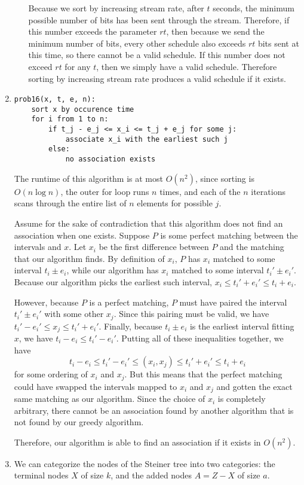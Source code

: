 \documentclass[oneside, 12pt]{article}
\begin{document}
\begin{enumerate}
\begin{enumerate}
Because we sort by increasing stream rate, after $t$ seconds, the minimum possible number of bits has been sent through the stream. Therefore, if this number exceeds the parameter $rt$, then because we send the minimum number of bits, every other schedule also exceeds $rt$ bits sent at this time, so there cannot be a valid schedule. If this number does not exceed $rt$ for any $t$, then we simply have a valid schedule. Therefore sorting by increasing stream rate produces a valid schedule if it exists. 
\end{enumerate}
\clearpage
\setcounter{enumi}{15}
\item
\begin{lstlisting}
prob16(x, t, e, n):
	sort x by occurence time
	for i from 1 to n:
		if t_j - e_j <= x_i <= t_j + e_j for some j:
			associate x_i with the earliest such j
		else:
			no association exists
\end{lstlisting}
The runtime of this algorithm is at most $O(n^2)$, since sorting is $O(n \log n)$, the outer for loop runs $n$ times, and each of the $n$ iterations scans through the entire list of $n$ elements for possible $j$. 

Assume for the sake of contradiction that this algorithm does not find an association when one exists. Suppose $P$ is some perfect matching between the intervals and $x$. Let $x_i$ be the first difference between $P$ and the matching that our algorithm finds. By definition of $x_i$, $P$ has $x_i$ matched to some interval $t_i \pm e_i$, while our algorithm has $x_i$ matched to some interval $t_i' \pm e_i'$. Because our algorithm picks the earliest such interval, $x_i \le t_i' + e_i' \le t_i + e_i$. 

However, because $P$ is a perfect matching, $P$ must have paired the interval $t_i' \pm e_i'$ with some other $x_j$. Since this pairing must be valid, we have $t_i' - e_i' \le x_j \le t_i' + e_i'$. Finally, because $t_i \pm e_i$ is the earliest interval fitting $x$, we have $t_i - e_i \le t_i' - e_i'$. Putting all of these inequalities together, we have 
\[
t_i - e_i \le t_i' - e_i' \le (x_i, x_j) \le t_i' + e_i' \le t_i + e_i
\]
for some ordering of $x_i$ and $x_j$. But this means that the perfect matching could have swapped the intervals mapped to $x_i$ and $x_j$ and gotten the exact same matching as our algorithm. Since the choice of $x_i$ is completely arbitrary, there cannot be an association found by another algorithm that is not found by our greedy algorithm.

Therefore, our algorithm is able to find an association if it exists in $O(n^2)$. 
\clearpage
\setcounter{enumi}{29}
\item
We can categorize the nodes of the Steiner tree into two categories: the terminal nodes $X$ of size $k$, and the added nodes $A = Z - X$ of size $a$.


\end{enumerate}
\end{document}
